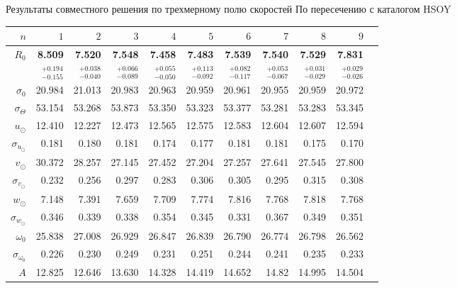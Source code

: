 \documentclass[compress]{beamer}
\newcommand\Fontvi{\fontsize{6}{7.2}\selectfont}
\begin{document}
\begin{frame}{Результаты совместного решения по трехмерному полю скоростей}
\Fontvi
По пересечению с каталогом HSOY
\begin{table}[h!!] \label{table_hsoy_sigma0}
\begin{tabular}{r|rr|r|r|r|rrrrr}
\hline
$n$ & $1$ & $2$ & $3$ & $4$ & $5$&$ 6 $&$ 7 $&$ 8 $&$ 9 $\\\hline
 $R_0 $& \textbf{8.509}       &     \textbf{7.520} &   \textbf{7.548} &   \textbf{7.458} &   \textbf{7.483} &   \textbf{7.539} &     \textbf{7.540} &   \textbf{7.529} &   \textbf{7.831} \\
       & $_{-0.155}^{+0.194} $ & $_{-0.040}^{+0.038}$ & $_{-0.089}^{+0.066}$   & $_{-0.050}^{+0.055}$  & $_{-0.092}^{+0.113}$  & $_{-0.117}^{+0.082}$  & $_{-0.067}^{+0.053}$  & $_{-0.029}^{+0.031}$  & $_{-0.026}^{+0.029}$  \\\hline
 $\sigma_0 $& 20.984      &  21.013 &  20.983 &  20.963 &  20.959 &  20.961 &  20.955 &  20.959 &  20.972  \\ 
 $\sigma_{\Theta} $& 53.154      &  53.268 &  53.873 &  53.350 &  53.323 &  53.377 &  53.281 &  53.283 &  53.345  \\\hline 
 $ u_{\odot} $& 12.410      &   12.227 &  12.473 &  12.565 &  12.575 &  12.583 &   12.604 &  12.607 &  12.594 \\
 $\sigma_{u_{\odot}} $&0.181       &     0.180 &   0.181 &   0.174 &   0.177 &   0.181 &    0.181 &   0.175 &    0.170 \\
 $v_{\odot} $& 30.372      &   28.257 &  27.145 &  27.452 &  27.204 &  27.257 &   27.641 &  27.545 &    27.800 \\
 $\sigma_{v_{\odot}}$&0.232       &    0.256 &   0.297 &   0.283 &   0.306 &   0.305 &    0.295 &   0.315 &   0.308 \\
 $w_{\odot} $& 7.148       &    7.391 &   7.659 &   7.709 &   7.774 &   7.816 &    7.768 &   7.818 &   7.768 \\
 $\sigma_{w_{\odot}}$&0.346       &    0.339 &   0.338 &   0.354 &   0.345 &   0.331 &    0.367 &   0.349 &   0.351 \\
 $\omega_0 $&25.838      &   27.008 &  26.929 &  26.847 &  26.839 &   26.790 &   26.774 &  26.798 &  26.562 \\
 $\sigma_{\omega_0} $& 0.226       &     0.230 &   0.249 &   0.231 &   0.251 &   0.244 &    0.241 &   0.235 &   0.233 \\\hline
 $A $&12.825      &   12.646 &   13.630 &  14.328 &  14.419 &  14.652 &    14.82 &  14.995 &  14.504 \\

\end{tabular}
\end{table}
\end{frame}
\end{document}
